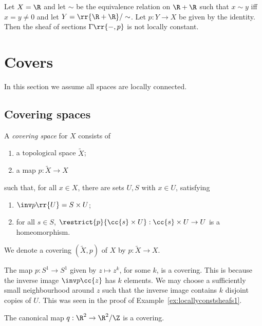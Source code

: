 \documentclass{article}
\begin{document}
\begin{example}
  Let $X=\R$ and let $\sim$ be the equivalence relation on $\R+\R$ such that
  $x\sim y$ iff $x=y\neq 0$ and let $Y=\rr{\R+\R}/\sim$. Let $p:Y\to X$ be
  given by the identity. Then the sheaf of sections $\Gamma\rr{-,p}$
  is not locally constant.
\end{example}

\section{Covers}\label{sec:covering_space}
In this section we assume all spaces are locally connected. 

\subsection{Covering spaces}

\begin{definition}
  A \emph{covering space} for $X$ consists of
  \begin{enumerate}
    \item a topological space $\tilde X$;
    \item a map $p:\tilde X\to X$
  \end{enumerate}
  such that, for all $x\in X$, there are sets $U,S$ with $x\in U$,
  satisfying
  \begin{enumerate}
    \item $\inv p\rr{U}=S\times U$;
    \item for all $s\in S$, $\restrict{p}{\cc{s}\times U}:\cc{s}\times U\to U$ is a
      homeomorphism.
  \end{enumerate}
\end{definition}

\begin{notation}
  We denote a covering $(\tilde X,p)$ of $X$ by $p:\tilde X\to X$.
\end{notation}

\begin{example}
  The map $p:S^1\to S^1$ given by $z\mapsto z^k$, for some $k$, is a covering.
  This is because the inverse image $\inv p\cc{z}$ has $k$
  elements. We may choose a sufficiently small neighbourhood around $z$
  such that the inverse image contains $k$ disjoint copies of $U$. This was seen
  in the proof of Example~\ref{ex:locallyconstsheafs1}.
\end{example}

\begin{example}
  The canonical map $q:\R^2\to\R^2/\Z$ is a covering.
\end{example}
\end{document}
